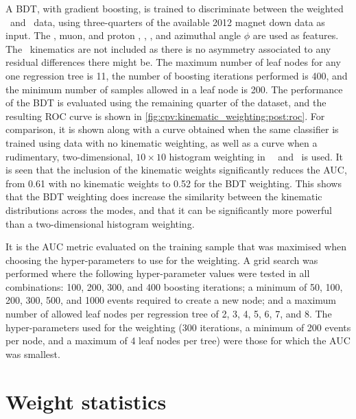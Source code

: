 A \ac{BDT}, with gradient boosting, is trained to discriminate between the 
weighted \pKK\ and \ppipi\ data, using three-quarters of the available 2012 
magnet down data as input.
The \PLambdab, muon, and proton \ptot, \pT, \Eta, and azimuthal angle $\phi$ 
are used as features.
The \PLambdac\ kinematics are not included as there is no asymmetry associated 
to any residual differences there might be.
The maximum number of leaf nodes for any one regression tree is 11, the number 
of boosting iterations performed is 400, and the minimum number of samples 
allowed in a leaf node is 200.
The performance of the \ac{BDT} is evaluated using the remaining quarter of the 
dataset, and the resulting \ac{ROC} curve is shown in 
\cref{fig:cpv:kinematic_weighting:post:roc}.
For comparison, it is shown along with a curve obtained when the same 
classifier is trained using data with no kinematic weighting, as well as a 
curve when a rudimentary, two-dimensional, $10\times10$ histogram weighting in 
\PLambdac\ \pT\ and \Eta\ is used.
It is seen that the inclusion of the kinematic weights significantly reduces 
the \ac{AUC}, from 0.61 with no kinematic weights to 0.52 for the \ac{BDT} 
weighting.
This shows that the \ac{BDT} weighting does increase the similarity between the 
kinematic distributions across the modes, and that it can be significantly more 
powerful than a two-dimensional histogram weighting.

It is the \ac{AUC} metric evaluated on the training sample that was maximised 
when choosing the hyper-parameters to use for the weighting.
A grid search was performed where the following hyper-parameter values were 
tested in all combinations: 100, 200, 300, and 400 boosting iterations; a 
minimum of 50, 100, 200, 300, 500, and 1000 events required to create a new 
node; and a maximum number of allowed leaf nodes per regression tree of 2, 3, 
4, 5, 6, 7, and 8.
The hyper-parameters used for the weighting (300 iterations, a minimum of 200 
events per node, and a maximum of 4 leaf nodes per tree) were those for which 
the \ac{AUC} was smallest.

\section{Weight statistics}
\label{chap:cpv:kinematic_weighting:stats}

